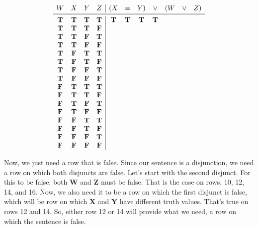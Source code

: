 \documentclass[../logic-text.tex]{subfiles}
\begin{document}
\[
\begin{array}{cccc|ccccccc}
  W & X & Y & Z & (X & \liff &  Y) & \lor & (W & \lor & Z)\\ \midrule
  \true & \true & \true & \true & \true & \true & \true & \true &&& \\
    \true & \true & \true & \false &&&&&&& \\
  \true & \true & \false & \true &&&&&&& \\
  \true & \true & \false & \false &&&&&&& \\
  \true & \false & \true & \true &&&&&&& \\
  \true & \false & \true & \false &&&&&&& \\
  \true & \false & \false & \true &&&&&&& \\
  \true & \false & \false & \false &&&&&&& \\
  \false & \true & \true & \true &&&&&&& \\
  \false & \true & \true & \false &&&&&&& \\
  \false & \true & \false & \true &&&&&&& \\
  \false & \true & \false & \false &&&&&&& \\
  \false & \false & \true & \true &&&&&&& \\
  \false & \false & \true & \false &&&&&&& \\
  \false & \false & \false & \true &&&&&&& \\
  \false & \false & \false & \false &&&&&&& \\
\end{array}
\]

Now, we just need a row that is false.
Since our sentence is a disjunction, we need a row on which both disjuncts are false.
Let's start with the second disjunct.
For this to be false, both \textbf{W} and \textbf{Z} must be false.
That is the case on rows, 10, 12, 14, and 16.
Now, we also need it to be a row on which the first disjunct is false, which will be row on which \textbf{X} and \textbf{Y} have different truth values.
That's true on rows 12 and 14.
So, either row 12 or 14 will provide what we need, a row on which the sentence is false.
\end{document}
